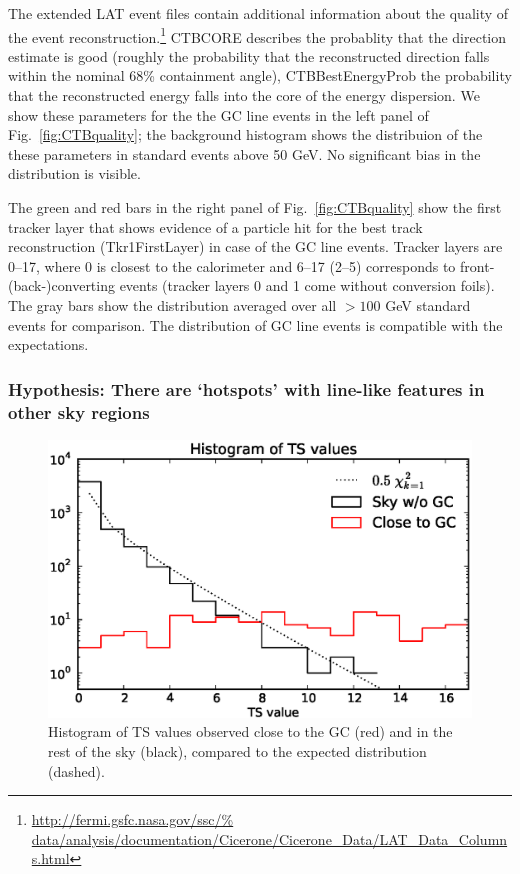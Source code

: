 \documentclass[aps,twocolumn,prd,superscriptaddress,showpacs,nofootinbib,fixfloat]{revtex4}
\begin{document}
The extended LAT event files contain additional information
about the quality of the event
reconstruction.\footnote{\url{http://fermi.gsfc.nasa.gov/ssc/%
data/analysis/documentation/Cicerone/Cicerone\_Data/LAT\_Data\_Columns.html}}
CTBCORE describes the probablity that the direction estimate
is good (roughly the probability that the reconstructed
direction falls within the nominal 68\% containment angle),
CTBBestEnergyProb the probability that the reconstructed
energy falls into the core of the energy dispersion. We show
these parameters for the the GC line events in the left
panel of Fig.~\ref{fig:CTBquality}; the background histogram
shows the distribuion of the these parameters in standard
events above 50 GeV. No significant bias in the distribution
is visible.

The green and red bars in the right panel of
Fig.~\ref{fig:CTBquality} show the first tracker layer that
shows evidence of a particle hit for the best track
reconstruction (Tkr1FirstLayer) in case of the GC line
events.  Tracker layers are 0--17, where 0 is closest to the
calorimeter and 6--17 (2--5) corresponds to front-
(back-)converting events (tracker layers 0 and 1 come
without conversion foils). The gray bars show the
distribution averaged over all $>100$ GeV standard events
for comparison. The distribution of GC line events is
compatible with the expectations.

\subsubsection{Hypothesis: There are `hotspots' with
line-like features in other sky regions}

\begin{figure}
  \begin{center}
    \includegraphics[width=1.0\linewidth]{plots/hotspot_histogram.eps}
  \end{center}
  \caption{Histogram of TS values observed close to the GC
  (red) and in the rest of the sky (black), compared to the
  expected distribution (dashed).}
  \label{fig:hotspots}
\end{figure}
\end{document}
